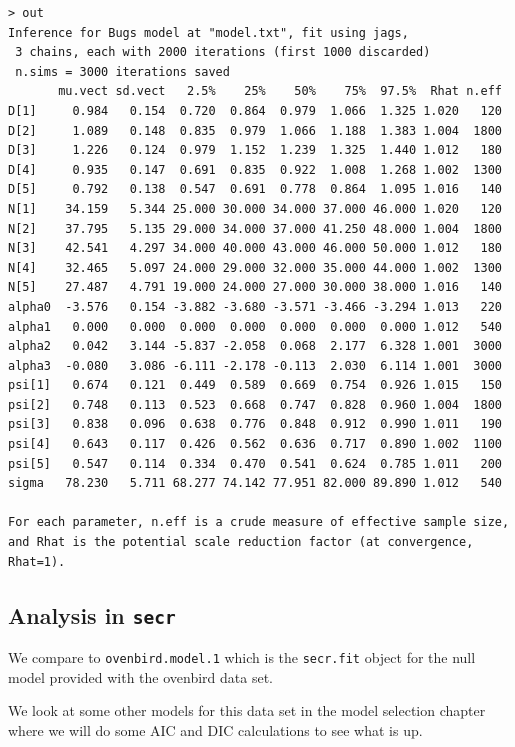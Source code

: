 \begin{verbatim}
> out
Inference for Bugs model at "model.txt", fit using jags,
 3 chains, each with 2000 iterations (first 1000 discarded)
 n.sims = 3000 iterations saved
       mu.vect sd.vect   2.5%    25%    50%    75%  97.5%  Rhat n.eff
D[1]     0.984   0.154  0.720  0.864  0.979  1.066  1.325 1.020   120
D[2]     1.089   0.148  0.835  0.979  1.066  1.188  1.383 1.004  1800
D[3]     1.226   0.124  0.979  1.152  1.239  1.325  1.440 1.012   180
D[4]     0.935   0.147  0.691  0.835  0.922  1.008  1.268 1.002  1300
D[5]     0.792   0.138  0.547  0.691  0.778  0.864  1.095 1.016   140
N[1]    34.159   5.344 25.000 30.000 34.000 37.000 46.000 1.020   120
N[2]    37.795   5.135 29.000 34.000 37.000 41.250 48.000 1.004  1800
N[3]    42.541   4.297 34.000 40.000 43.000 46.000 50.000 1.012   180
N[4]    32.465   5.097 24.000 29.000 32.000 35.000 44.000 1.002  1300
N[5]    27.487   4.791 19.000 24.000 27.000 30.000 38.000 1.016   140
alpha0  -3.576   0.154 -3.882 -3.680 -3.571 -3.466 -3.294 1.013   220
alpha1   0.000   0.000  0.000  0.000  0.000  0.000  0.000 1.012   540
alpha2   0.042   3.144 -5.837 -2.058  0.068  2.177  6.328 1.001  3000
alpha3  -0.080   3.086 -6.111 -2.178 -0.113  2.030  6.114 1.001  3000
psi[1]   0.674   0.121  0.449  0.589  0.669  0.754  0.926 1.015   150
psi[2]   0.748   0.113  0.523  0.668  0.747  0.828  0.960 1.004  1800
psi[3]   0.838   0.096  0.638  0.776  0.848  0.912  0.990 1.011   190
psi[4]   0.643   0.117  0.426  0.562  0.636  0.717  0.890 1.002  1100
psi[5]   0.547   0.114  0.334  0.470  0.541  0.624  0.785 1.011   200
sigma   78.230   5.711 68.277 74.142 77.951 82.000 89.890 1.012   540

For each parameter, n.eff is a crude measure of effective sample size,
and Rhat is the potential scale reduction factor (at convergence, Rhat=1).
\end{verbatim}



\subsection{Analysis in \mbox{\tt secr} }


We compare to {\tt ovenbird.model.1} which is the \mbox{\tt secr.fit}
object for the null model provided with the ovenbird data set. 

We look at some other models for this data set in the model selection
chapter where we will do some AIC and DIC calculations to see what is up.


